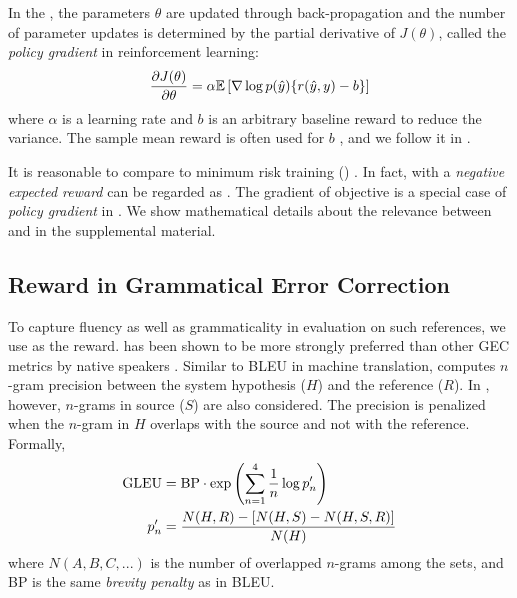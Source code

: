 In the \encdec, the parameters $\theta$ are updated through back-propagation and the number of parameter updates is determined by the partial derivative of $J(\theta)$, called the {\em policy gradient} \cite{williams1992simple,sutton1999policy} in reinforcement learning:
\begin{align}
\label{eq:partialj}
\frac {\partial J(\theta)}{\partial \theta} = \alpha \mathbb{E} \left[\nabla \log p(\hat{y}) \{r(\hat{y},y) - b \}  \right]
\end{align}
where $\alpha$ is a learning rate and $b$ is an arbitrary baseline reward to reduce the variance.
The sample mean reward is often used for $b$ \cite{williams1992simple}, and we follow it in \proposed.

It is reasonable to compare \proposed to minimum risk training (\mrt) \cite{shen-EtAl:2016:P16-1}.
In fact, \proposed with a {\em negative expected reward} can be regarded as \mrt.
The gradient of \mrt objective is a special case of {\em policy gradient} in \proposed.
We show mathematical details about the relevance between \proposed and \mrt in the supplemental material.

\subsection{Reward in Grammatical Error Correction}
\label{sec:gleu}
To capture fluency as well as grammaticality in evaluation on such references, we use \metric as the reward.
\metric has been shown to be more strongly preferred than other GEC metrics by native speakers \cite{TACL800}. 
Similar to BLEU in machine translation, \metric computes $n$-gram precision between the system hypothesis ($H$) and the reference ($R$).
In \metric, however, $n$-grams in source ($S$) are also considered. The precision is penalized when the $n$-gram in $H$ overlaps with the source and not with the reference.
Formally, 
\begin{align}
\text{GLEU} &= \text{BP}\cdot \exp \left( \sum_{n=1}^4 \frac{1}{n} \log p'_n \right) \nonumber \\
p'_n &= \frac{ N(H,R) - \left[ N(H,S)-N(H,S,R) \right] }{N(H)} \nonumber
\end{align}
where  $N(A,B,C,...)$ is the number of overlapped $n$-grams among the sets, and BP is the same {\em brevity penalty} as in BLEU.